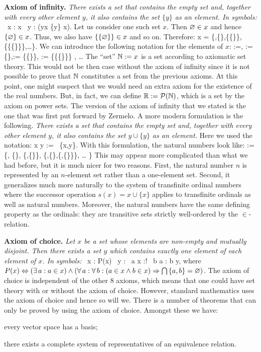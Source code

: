 \textbf{Axiom of infinity.}
\emph{There exists a set that contains the empty set and,  together with every
other element $y$, it also contains the set $\{y\}$ as an element. In
symbols:}
\bse
\exists \, x : \vn \in x \land \forall \, y : (y\in x \imp \{y\} \in x).
\ese
Let us consider one such set $x$. Then $\varnothing \in x$ and hence $\{\varnothing\}\in x$.
Thus, we also have $\{\{\varnothing\}\}\in x$ and so on. Therefore:
\bse
x = \{\vn,\{\vn\},\{\{\vn\}\},\{\{\{\vn\}\}\},\ldots\}.
\ese
We can introduce the following notation for the elements of $x$:
 :=\vn ,   := \{\vn\},:= \{\{\vn\}\}, := \{\{\{\vn\}\}\}
, \quad \ldots
\ese
\bc
The ``set'' $\mathbb{N}:=x$\index{$\N$} is a set according to axiomatic set theory.
\ec
This would not be then case without the axiom of infinity since it is not
possible to prove that $\N$ constitutes a set from the previous axioms.
\br
At this point, one might suspect that we would need an extra axiom for the
existence of the real numbers. But, in fact, we can define $\mathbb{R} := \mathcal{P}(\mathbb{N})$,
which is a set by the axiom on power sets.
\er
\br
\label{rem:natural_numbers_modern_form}
The version of the axiom of infinity that we stated is the one that was first
put forward by Zermelo. A more modern formulation is the following.
\emph{There exists a set that contains the empty set and, together with every
other element $y$, it also contains the set $y\cup\{y\}$ as an element.} Here
we used the notation:
\bse
x \cup y := \bigcup \, \{x,y\}.
\ese
With this formulation, the natural numbers look like:
\bse
\N := \{\vn, \{\vn\}, \{\vn,\{\vn\}\}, \{\vn,\{\vn\},\{\vn,\{\vn\}\}\}, \ldots
\}
\ese
This may appear more complicated than what we had before, but it is much nicer
for two reasons.  First, the natural number $n$ is represented by an
$n$-element set rather than a one-element set. Second, it generalizes much
more naturally to the system of transfinite ordinal numbers where the
successor operation $s(x)=x\cup\{x\}$ applies to transfinite ordinals as well
as natural numbers. Moreover, the natural numbers have the same defining
property as the ordinals: they are transitive sets strictly well-ordered by
the $\in$-relation.
\er

\textbf{Axiom of choice.} \emph{Let $x$ be a set whose
elements are non-empty and mutually disjoint. Then there exists a set $y$
which contains exactly one element of each element of $x$. In symbols:}
\bse
\forall \, x : P(x) \imp \exists \, y : \forall \, a \in x :\exists! \, b \in
a : b \in y,
\ese
where $P(x) \Leftrightarrow (\exists \,a : a \in x) \land (\forall \, a : \forall \, b :
(a\in x \land b \in x) \Rightarrow \bigcap \, \{a,b\} = \varnothing )$.
\br
The axiom of choice is independent of the other 8 axioms, which means that one
could have set theory with or without the axiom of choice. However, standard
mathematics uses the axiom of choice and hence so will we. There is a number
of theorems that can only be proved by using the axiom of choice. Amongst
these we have:
\bit
\item every vector space has a basis;
\item there exists a complete system of representatives of an equivalence
relation.
\eit
\er

